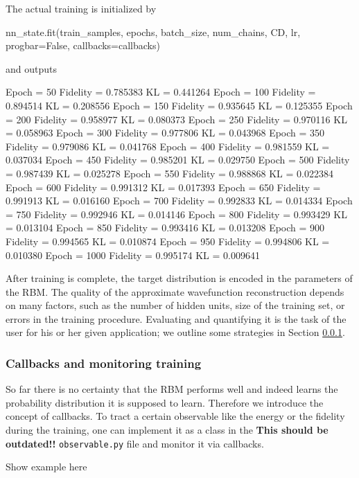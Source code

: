 \documentclass[submission, Phys]{SciPost}
\begin{document}
The actual training is initialized by
\begin{python}
nn_state.fit(train_samples, epochs, batch_size, num_chains, CD, lr, progbar=False, callbacks=callbacks)
\end{python}
and outputs
\begin{python}
	Epoch = 50	Fidelity = 0.785383	KL = 0.441264
	Epoch = 100	Fidelity = 0.894514	KL = 0.208556
	Epoch = 150	Fidelity = 0.935645	KL = 0.125355
	Epoch = 200	Fidelity = 0.958977	KL = 0.080373
	Epoch = 250	Fidelity = 0.970116	KL = 0.058963
	Epoch = 300	Fidelity = 0.977806	KL = 0.043968
	Epoch = 350	Fidelity = 0.979086	KL = 0.041768
	Epoch = 400	Fidelity = 0.981559	KL = 0.037034
	Epoch = 450	Fidelity = 0.985201	KL = 0.029750
	Epoch = 500	Fidelity = 0.987439	KL = 0.025278
	Epoch = 550	Fidelity = 0.988868	KL = 0.022384
	Epoch = 600	Fidelity = 0.991312	KL = 0.017393
	Epoch = 650	Fidelity = 0.991913	KL = 0.016160
	Epoch = 700	Fidelity = 0.992833	KL = 0.014334
	Epoch = 750	Fidelity = 0.992946	KL = 0.014146
	Epoch = 800	Fidelity = 0.993429	KL = 0.013104
	Epoch = 850	Fidelity = 0.993416	KL = 0.013208
	Epoch = 900	Fidelity = 0.994565	KL = 0.010874
	Epoch = 950	Fidelity = 0.994806	KL = 0.010380
	Epoch = 1000	Fidelity = 0.995174	KL = 0.009641
\end{python}

After training is complete, the target distribution is encoded in the parameters of the RBM.
The quality of the approximate wavefunction reconstruction depends on many factors, such as the number of hidden units, size of the training set, or errors in the training procedure.
Evaluating and quantifying it is the task of the user for his or her given application; we outline some strategies in Section \ref{Sec:Callbacks}.

\subsubsection{Callbacks and monitoring training}
\label{Sec:Callbacks}

So far there is no certainty that the RBM performs well and indeed learns the probability distribution it is supposed to learn.
Therefore we introduce the concept of callbacks. 
To tract a certain observable like the energy or the fidelity during the training, one can implement it as a class in the \textbf{This should be outdated!!} \verb|observable.py| file and monitor it via callbacks.

\begin{python}
	Show example here
\end{python}
\end{document}
